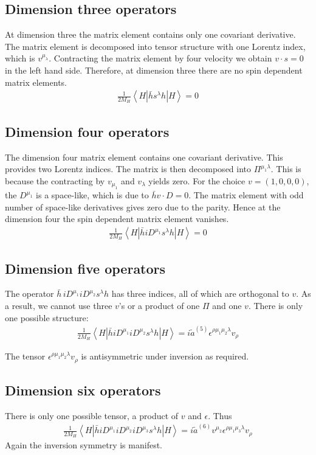 \subsection{Dimension three operators}
At dimension three the matrix element contains only one covariant derivative. The matrix element is decomposed into tensor structure with one Lorentz index, which is $v^{\mu_{\lambda}}$. Contracting the matrix element by four velocity we obtain $v\cdot s=0$ in the left hand side. Therefore, at dimension three there are no spin dependent matrix elements.
\begin{eqnarray}
\frac{1}{2 M_{H}}\left\langle H\left|\bar{h} s^{\lambda} h\right| H\right\rangle= 0
\end{eqnarray}
\subsection{Dimension four operators}
The dimension four matrix element contains one covariant derivative. This provides two Lorentz indices. The matrix is then decomposed into $\Pi^{\mu_1 \lambda}$. This is because the contracting by $v_{\mu_1}$ and $v_{\lambda}$ yields zero. For the choice $v=(1,0,0,0)$, the $D^{\mu_1}$ is a space-like, which is due to $\bar{h}v\cdot D=0$. The matrix element with odd number of space-like derivatives gives zero due to the parity. Hence at the dimension four the spin dependent matrix element vanishes.
\begin{eqnarray}
\frac{1}{2 M_{H}}\left\langle H\left|\bar{h} i D^{\mu_{1}} s^{\lambda} h\right| H\right\rangle= 0
\end{eqnarray}
\subsection{Dimension five operators}
The operator $\bar h\, iD^{\mu_1}iD^{\mu_2}s^\lambda h$ has three indices, all of which are orthogonal to $v$. As a result, we cannot use three $v$'s  or a product of one $\Pi$ and one $v$. There is only one possible structure:
\vspace{-0.5cm}
\begin{eqnarray}
\frac{1}{2 M_{H}}\left\langle H\left|\bar{h} i D^{\mu_{1}} i D^{\mu_{2}} s^{\lambda} h\right| H\right\rangle= i \tilde{a}^{(5)} \epsilon^{\rho \mu_{1} \mu_{2} \lambda} v_{\rho}
\end{eqnarray}

The tensor $\epsilon^{\rho\mu_1\mu_2\lambda}v_{\rho}$ is antisymmetric under inversion as required.
\subsection{Dimension six operators}
There is only one possible tensor, a product of $v$ and $\epsilon$. Thus   
\begin{eqnarray}\label{eqn:dim6_SD_tensor_decomp}
\frac{1}{2 M_{H}}\left\langle H\left|\bar{h} i D^{\mu_{1}} i D^{\mu_{2}} i D^{\mu_{3}} s^{\lambda} h\right| H\right\rangle= i \tilde{a}^{(6)} v^{\mu_{2}} \epsilon^{\rho \mu_{1} \mu_{3} \lambda} v_{\rho}
\end{eqnarray}
Again the inversion symmetry is manifest.
